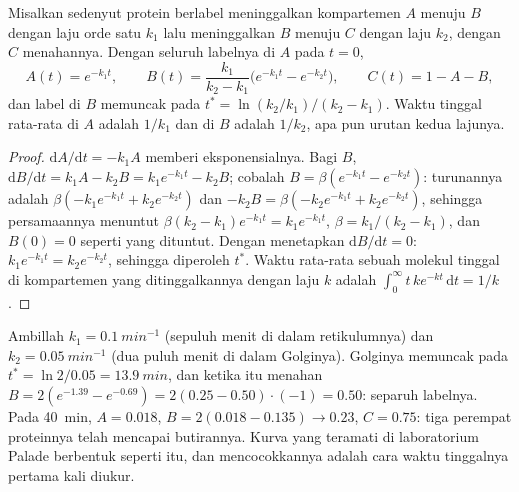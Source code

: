 \begin{theorem}\label{thm:b3:membrane-traffic:pulse-chase}
Misalkan sedenyut protein berlabel meninggalkan kompartemen $A$ menuju $B$
dengan laju orde satu $k_{1}$ lalu meninggalkan $B$ menuju $C$ dengan laju
$k_{2}$, dengan $C$ menahannya. Dengan seluruh labelnya di $A$ pada $t = 0$,
\[
A(t) = e^{-k_{1}t},\qquad
B(t) = \frac{k_{1}}{k_{2} - k_{1}}\bigl(e^{-k_{1}t} - e^{-k_{2}t}\bigr),
\qquad
C(t) = 1 - A - B,
\]
dan label di $B$ memuncak pada $t^{*} = \ln(k_{2}/k_{1})/(k_{2} - k_{1})$.
Waktu tinggal rata-rata di $A$ adalah $1/k_{1}$ dan di $B$ adalah $1/k_{2}$,
apa pun urutan kedua lajunya.
\end{theorem}
\begin{proof}
$\mathrm{d}A/\mathrm{d}t = -k_{1}A$ memberi eksponensialnya. Bagi $B$,
$\mathrm{d}B/\mathrm{d}t = k_{1}A - k_{2}B = k_{1}e^{-k_{1}t} - k_{2}B$;
cobalah $B = \beta(e^{-k_{1}t} - e^{-k_{2}t})$: turunannya adalah
$\beta(-k_{1}e^{-k_{1}t} + k_{2}e^{-k_{2}t})$ dan $-k_{2}B = \beta(-k_{2}
e^{-k_{1}t} + k_{2}e^{-k_{2}t})$, sehingga persamaannya menuntut $\beta(k_{2}
- k_{1})e^{-k_{1}t} = k_{1}e^{-k_{1}t}$, $\beta = k_{1}/(k_{2} -
k_{1})$, dan $B(0) = 0$ seperti yang dituntut. Dengan menetapkan $\mathrm{d}B/\mathrm{d}t =
0$: $k_{1}e^{-k_{1}t} = k_{2}e^{-k_{2}t}$, sehingga diperoleh $t^{*}$. Waktu
rata-rata sebuah molekul tinggal di kompartemen yang ditinggalkannya dengan
laju $k$ adalah $\int_{0}^{
\infty} t\,k e^{-kt}\,\mathrm{d}t = 1/k$.
\end{proof}

\begin{example}\label{ex:b3:membrane-traffic:palade}
Ambillah $k_{1} = \qty{0.1}{min^{-1}}$ (sepuluh menit di dalam retikulumnya)
dan $k_{2} = \qty{0.05}{min^{-1}}$ (dua puluh menit di dalam Golginya).
Golginya memuncak pada $t^{*} = \ln 2/0.05 = \qty{13.9}{min}$, dan ketika itu
menahan $B = 2(e^{-1.39} -
e^{-0.69}) = 2(0.25 - 0.50)\cdot(-1) = 0.50$: separuh labelnya. Pada
\qty{40}{min}, $A = 0.018$, $B = 2(0.018 - 0.135) \to 0.23$, $C = 0.75$:
tiga perempat proteinnya telah mencapai butirannya. Kurva yang teramati di
laboratorium Palade berbentuk seperti itu, dan mencocokkannya adalah cara
waktu tinggalnya pertama kali diukur.
\end{example}

